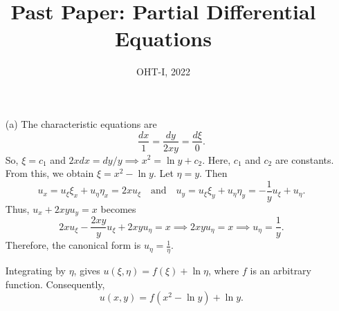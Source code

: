 \documentclass[11pt]{penrose}
\title{Past Paper: Partial Differential Equations}
\subtitle{OHT-I, 2022}
\begin{document}
\maketitle
\warningtext

\begin{problem}{1}
    
    \begin{enumerate}
        \item[(a)] The characteristic equations are
        \begin{equation*}
            \frac{dx}{1} = \frac{dy}{2xy} = \frac{d\xi}{0}.
        \end{equation*}
        So, $\xi = c_1$ and $2x dx = dy/y \implies x^2 = \ln y + c_2$. Here, $c_1$ and $c_2$ are constants. From this, we obtain $\xi = x^2 - \ln y$. Let $\eta = y$. Then
        \begin{equation*}
            u_x = u_\xi \xi_x + u_\eta \eta_x = 2x u_\xi
            \quad\text{and}\quad
            u_y = u_\xi \xi_y + u_\eta \eta_y = -\frac{1}{y} u_\xi + u_\eta.
        \end{equation*}
        Thus, $u_x + 2xy u_y = x$ becomes
        \begin{equation*}
            2x u_\xi -\frac{2xy}{y} u_\xi + 2xy u_\eta = x
            \implies
            2xy u_\eta = x
            \implies
            u_\eta = \frac{1}{y}.
        \end{equation*}
        Therefore, the canonical form is $u_\eta = \frac{1}{\eta}$.

        Integrating by $\eta$, gives $u(\xi, \eta) = f(\xi) + \ln\eta$, where $f$ is an arbitrary function. Consequently,
        \begin{equation*}
            u(x,y) = f(x^2 - \ln y) + \ln y.
        \end{equation*}


\end{enumerate}
\end{problem}
\end{document}
